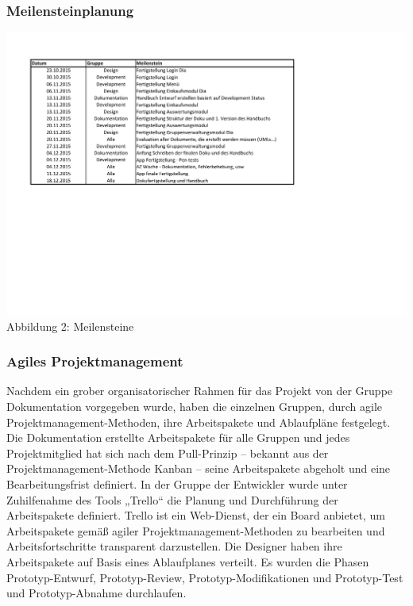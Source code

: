 \documentclass[12pt,a4paper]{article}
\begin{document}
\subsubsection*{Meilensteinplanung}
\hspace*{-10mm} \includegraphics[trim = 10mm 90mm 10mm 20mm,clip, scale=0.9]{Meilensteine.pdf}
\\
\footnotesize Abbildung 2: Meilensteine
\normalsize

\subsubsection{Agiles Projektmanagement}
Nachdem ein grober organisatorischer Rahmen für das Projekt von der Gruppe Dokumentation vorgegeben wurde, haben die einzelnen Gruppen, durch agile Projektmanagement-Methoden,  ihre Arbeitspakete und Ablaufpläne festgelegt. 
Die Dokumentation erstellte Arbeitspakete für alle Gruppen und jedes Projektmitglied hat sich nach dem Pull-Prinzip – bekannt aus der Projektmanagement-Methode Kanban – seine Arbeitspakete abgeholt und eine Bearbeitungsfrist definiert. 
In der Gruppe der Entwickler wurde unter Zuhilfenahme des Tools „Trello“ die Planung und Durchführung der Arbeitspakete definiert. Trello ist ein Web-Dienst, der ein Board anbietet, um Arbeitspakete gemäß agiler Projektmanagement-Methoden zu bearbeiten und Arbeitsfortschritte transparent darzustellen. 
Die Designer haben ihre Arbeitspakete auf Basis eines Ablaufplanes verteilt. Es wurden die Phasen Prototyp-Entwurf, Prototyp-Review, Prototyp-Modifikationen und Prototyp-Test und Prototyp-Abnahme durchlaufen.
\newpage
\end{document}
